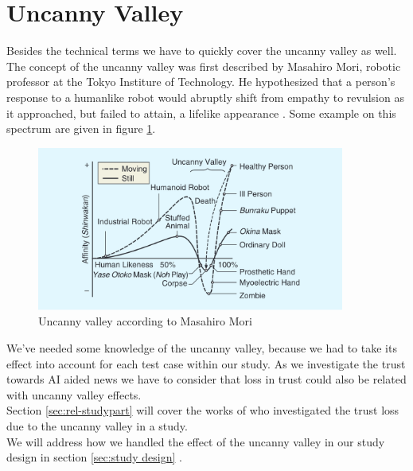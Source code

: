 \documentclass[
  a4paper,  %
  twoside,  %
  bibliography=totoc,
  headsepline,
  cleardoublepage=empty,
  parskip=half,
  draft=false
]{scrbook}
\begin{document}
\section{Uncanny Valley}
Besides the technical terms we have to quickly cover the uncanny valley as well. The concept of the uncanny valley was first described by Masahiro Mori, robotic professor at the Tokyo Institure of Technology. He hypothesized that a person's response to a humanlike robot would abruptly shift from empathy to revulsion as it approached, but failed to attain, a lifelike appearance \cite{moriUncannyValleyField2012}. Some example on this spectrum are given in figure \ref{fig:uncanny-valley}.
\begin{figure}[h]
  \centering
  \includegraphics[width=0.9\textwidth]{./graphics/images/uncanny-valley.png}
  \caption{Uncanny valley according to Masahiro Mori \cite{moriUncannyValleyField2012}}
  \label{fig:uncanny-valley}
\end{figure}
We've needed some knowledge of the uncanny valley, because we had to take its effect into account for each test case within our study. As we investigate the trust towards AI aided news we have to consider that loss in trust could also be related with uncanny valley effects. \\
Section \ref{sec:rel-studypart} will cover the works of \citeauthor{weismanFaceUncannyEffects2021} who investigated the trust loss due to the uncanny valley in a study. \\
We will address how we handled the effect of the uncanny valley in our study design in section \ref{sec:study design}
.
\end{document}
